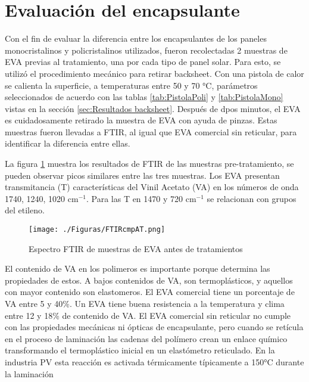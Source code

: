 \clearpage

\section{Evaluación del encapsulante}    
\label{sec:evaluacionEVA}

Con el fin de evaluar la diferencia entre los encapsulantes de los paneles monocristalinos y policristalinos utilizados, fueron recolectadas 2 muestras de EVA previas al tratamiento, una por cada tipo de panel solar. Para esto, se utilizó el procedimiento mecánico para retirar backsheet. Con una pistola de calor se calienta la superficie, a temperaturas entre 50 y 70 °C, parámetros seleccionados de acuerdo con las tablas \ref{tab:PistolaPoli} y \ref{tab:PistolaMono} vistas en la sección \ref{sec:Resultados backsheet}. Después de dpos minutos, el EVA es cuidadosamente retirado la muestra de EVA con ayuda de pinzas. Estas muestras fueron llevadas a FTIR, al igual que EVA comercial sin reticular, para identificar la diferencia entre ellas. 

La figura \ref{fig:FTIR-T} muestra los resultados de FTIR de las muestras pre-tratamiento, se pueden observar picos similares entre las tres muestras. Los EVA presentan transmitancia (T) características del Vinil Acetato (VA) en los números de onda 1740, 1240, 1020 cm$^{-1}$. Para las T en 1470 y 720 cm$^{-1}$ se relacionan con grupos del etileno.

\begin{figure}[htb]
	\begin{center}
		\texttt{[image: ./Figuras/FTIRcmpAT.png]}
	\end{center}
	\vspace{-1em} %
	\caption{Espectro FTIR de muestras de EVA antes de tratamientos}
	\label{fig:FTIR-T}
\end{figure}

El contenido de VA en los polimeros es importante porque determina las propiedades de estos. A bajos contenidos de VA, son termoplásticos, y aquellos con mayor contenido son elastomeros. El EVA comercial tiene un porcentaje de VA entre 5 y 40\%. Un EVA tiene buena resistencia a la temperatura y clima entre 12 y 18\% de contenido de VA. El EVA comercial sin reticular no cumple con las propiedades mecánicas ni ópticas de encapsulante, pero cuando se retícula en el proceso de laminación las cadenas del polímero crean un enlace químico transformando el termoplástico inicial en un elastómetro reticulado. En la industria PV esta reacción es activada térmicamente típicamente a 150°C durante la laminación

